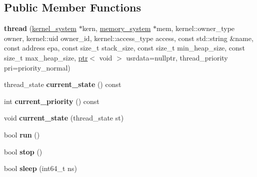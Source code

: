 \subsection*{Public Member Functions}
\begin{DoxyCompactItemize}
\item 
\mbox{\label{classeka2l1_1_1kernel_1_1thread_a9a4405fb373bffdb46ce05fca0762a62}} 
{\bfseries thread} (\mbox{\hyperlink{classeka2l1_1_1kernel__system}{kernel\+\_\+system}} $\ast$kern, \mbox{\hyperlink{classeka2l1_1_1memory__system}{memory\+\_\+system}} $\ast$mem, kernel\+::owner\+\_\+type owner, kernel\+::uid owner\+\_\+id, kernel\+::access\+\_\+type access, const std\+::string \&name, const address epa, const size\+\_\+t stack\+\_\+size, const size\+\_\+t min\+\_\+heap\+\_\+size, const size\+\_\+t max\+\_\+heap\+\_\+size, \mbox{\hyperlink{classeka2l1_1_1ptr}{ptr}}$<$ void $>$ usrdata=nullptr, thread\+\_\+priority pri=priority\+\_\+normal)
\item 
\mbox{\label{classeka2l1_1_1kernel_1_1thread_a15b81c2aabe2ee1670deb5aa00cca70c}} 
thread\+\_\+state {\bfseries current\+\_\+state} () const
\item 
\mbox{\label{classeka2l1_1_1kernel_1_1thread_a5260b4d31be4dbd573e937ebe5c01bdc}} 
int {\bfseries current\+\_\+priority} () const
\item 
\mbox{\label{classeka2l1_1_1kernel_1_1thread_a691b3b51ffd22bc9046343c75f4cb82f}} 
void {\bfseries current\+\_\+state} (thread\+\_\+state st)
\item 
\mbox{\label{classeka2l1_1_1kernel_1_1thread_a72026c1a11581888189b02651324c2d2}} 
bool {\bfseries run} ()
\item 
\mbox{\label{classeka2l1_1_1kernel_1_1thread_af273a63620af44da7beb27270e0155bb}} 
bool {\bfseries stop} ()
\item 
\mbox{\label{classeka2l1_1_1kernel_1_1thread_a27effe04a23d30cc465bcfc0b7200dea}} 
bool {\bfseries sleep} (int64\+\_\+t ns)
\item 
\mbox{\label{classeka2l1_1_1kernel_1_1thread_a23a04b0734ab2a86d8c2ba6095e39c4a}} 

\end{DoxyCompactItemize}
